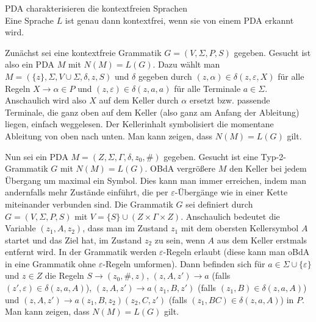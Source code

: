\linie

\begin{Satz}{PDA charakterisieren die kontextfreien Sprachen}\\
    Eine Sprache $L$ ist genau dann kontextfrei, wenn sie von einem PDA
    erkannt wird.
\end{Satz}

\begin{Beweis}
    Zunächst sei eine kontextfreie Grammatik $G = (V, \Sigma, P, S)$ gegeben.
    Gesucht ist also ein PDA $M$ mit $N(M) = L(G)$.
    Dazu wählt man $M = (\{z\}, \Sigma, V \cup \Sigma, \delta, z, S)$ und
    $\delta$ gegeben durch
    $(z, \alpha) \in \delta(z, \varepsilon, X)$ für alle Regeln
    $X \rightarrow \alpha \in P$ und
    $(z, \varepsilon) \in \delta(z, a, a)$ für alle Terminale $a \in \Sigma$.
    Anschaulich wird also $X$ auf dem Keller durch $\alpha$ ersetzt bzw.
    passende Terminale, die ganz oben auf dem Keller
    (also ganz am Anfang der Ableitung) liegen, einfach weggelesen.
    Der Kellerinhalt symbolisiert die momentane Ableitung von oben nach unten.
    Man kann zeigen, dass $N(M) = L(G)$ gilt.

    Nun sei ein PDA $M = (Z, \Sigma, \Gamma, \delta, z_0, \#)$ gegeben.
    Gesucht ist eine Typ-2-Grammatik $G$ mit $N(M) = L(G)$.
    OBdA vergrößere $M$ den Keller bei jedem Übergang um maximal ein Symbol.
    Dies kann man immer erreichen, indem man andernfalls mehr Zustände
    einführt, die per $\varepsilon$-Übergänge wie in einer Kette miteinander
    verbunden sind.
    Die Grammatik $G$ sei definiert durch $G = (V, \Sigma, P, S)$ mit
    $V = \{S\} \cup (Z \times \Gamma \times Z)$.
    Anschaulich bedeutet die Variable $(z_1, A, z_2)$, dass man im Zustand
    $z_1$ mit dem obersten Kellersymbol $A$ startet und das Ziel hat,
    im Zustand $z_2$ zu sein, wenn $A$ aus dem Keller erstmals entfernt wird.
    In der Grammatik werden $\varepsilon$-Regeln erlaubt
    (diese kann man oBdA in eine Grammatik ohne $\varepsilon$-Regeln umformen).
    Dann befinden sich für $a \in \Sigma \cup \{\varepsilon\}$ und
    $z \in Z$ die Regeln
    $S \rightarrow (z_0, \#, z)$,
    $(z, A, z') \rightarrow a$
    (falls $(z', \varepsilon) \in \delta(z, a, A)$),
    $(z, A, z') \rightarrow a (z_1, B, z')$
    (falls $(z_1, B) \in \delta(z, a, A)$) und
    $(z, A, z') \rightarrow a (z_1, B, z_2) (z_2, C, z')$
    (falls $(z_1, BC) \in \delta(z, a, A)$) in $P$.
    Man kann zeigen, dass $N(M) = L(G)$ gilt.
\end{Beweis}


